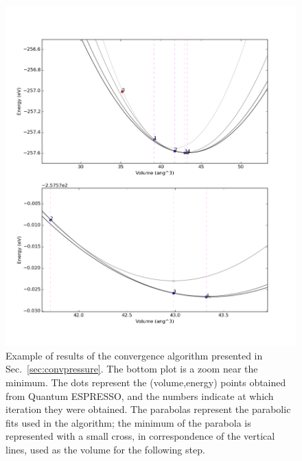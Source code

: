 \begin{figure}[tb]
\centering\includegraphics[width=0.6\linewidth]{img/convergence_pressure}
\caption{\label{fig:convpressure}Example of results of the convergence algorithm presented in Sec.~\ref{sec:convpressure}. The bottom plot is a zoom near the minimum. The dots represent the (volume,energy) points obtained from Quantum ESPRESSO, and the numbers indicate at which iteration they were obtained. The parabolas represent the parabolic fits used in the algorithm; the minimum of the parabola is represented with a small cross, in correspondence of the vertical lines, used as the volume for the following step.}
\end{figure} 


